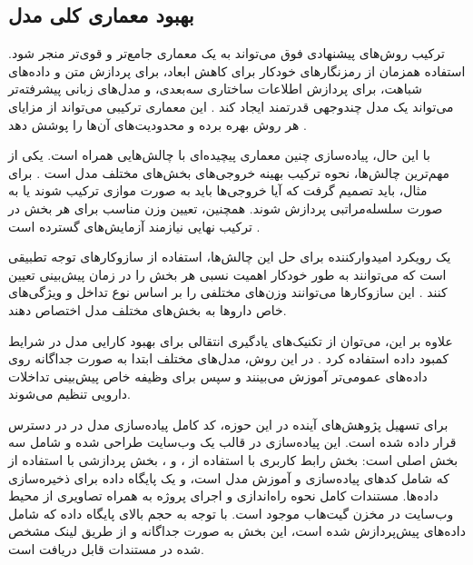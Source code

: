 \subsection{بهبود معماری کلی مدل}

ترکیب روش‌های پیشنهادی فوق می‌تواند به یک معماری جامع‌تر و قوی‌تر منجر شود. استفاده همزمان از رمزنگارهای خودکار برای کاهش ابعاد،  برای پردازش متن و داده‌های شباهت،  برای پردازش اطلاعات ساختاری سه‌بعدی، و مدل‌های زبانی پیشرفته‌تر می‌تواند یک مدل چندوجهی قدرتمند ایجاد کند \cite{ref_shi2024}. این معماری ترکیبی می‌تواند از مزایای هر روش بهره برده و محدودیت‌های آن‌ها را پوشش دهد \cite{ref_he2023}.

با این حال، پیاده‌سازی چنین معماری پیچیده‌ای با چالش‌هایی همراه است. یکی از مهم‌ترین چالش‌ها، نحوه ترکیب بهینه خروجی‌های بخش‌های مختلف مدل است \cite{ref_dai2020}. برای مثال، باید تصمیم گرفت که آیا خروجی‌ها باید به صورت موازی ترکیب شوند یا به صورت سلسله‌مراتبی پردازش شوند. همچنین، تعیین وزن مناسب برای هر بخش در ترکیب نهایی نیازمند آزمایش‌های گسترده است \cite{ref_yang2022}.

یک رویکرد امیدوارکننده برای حل این چالش‌ها، استفاده از سازوکار‌های توجه تطبیقی است که می‌توانند به طور خودکار اهمیت نسبی هر بخش را در زمان پیش‌بینی تعیین کنند \cite{ref_lin2022}. این سازوکار‌ها می‌توانند وزن‌های مختلفی را بر اساس نوع تداخل و ویژگی‌های خاص داروها به بخش‌های مختلف مدل اختصاص دهند.

علاوه بر این، می‌توان از تکنیک‌های یادگیری انتقالی برای بهبود کارایی مدل در شرایط کمبود داده استفاده کرد \cite{ref_deng2022}. در این روش، مدل‌های مختلف ابتدا به صورت جداگانه روی داده‌های عمومی‌تر آموزش می‌بینند و سپس برای وظیفه خاص پیش‌بینی تداخلات دارویی تنظیم می‌شوند.

\vspace{1cm}

برای تسهیل پژوهش‌های آینده در این حوزه، کد کامل پیاده‌سازی مدل در \cite{ref_github} در دسترس قرار داده شده است. این پیاده‌سازی در قالب یک وب‌سایت طراحی شده و شامل سه بخش اصلی است: بخش رابط کاربری با استفاده از ،  و ، بخش پردازشی با استفاده از  که شامل کدهای پیاده‌سازی و آموزش مدل است، و یک پایگاه داده  برای ذخیره‌سازی داده‌ها. مستندات کامل نحوه راه‌اندازی و اجرای پروژه به همراه تصاویری از محیط وب‌سایت در مخزن گیت‌هاب موجود است. با توجه به حجم بالای پایگاه داده که شامل داده‌های پیش‌پردازش شده است، این بخش به صورت جداگانه و از طریق لینک مشخص شده در مستندات قابل دریافت است.
